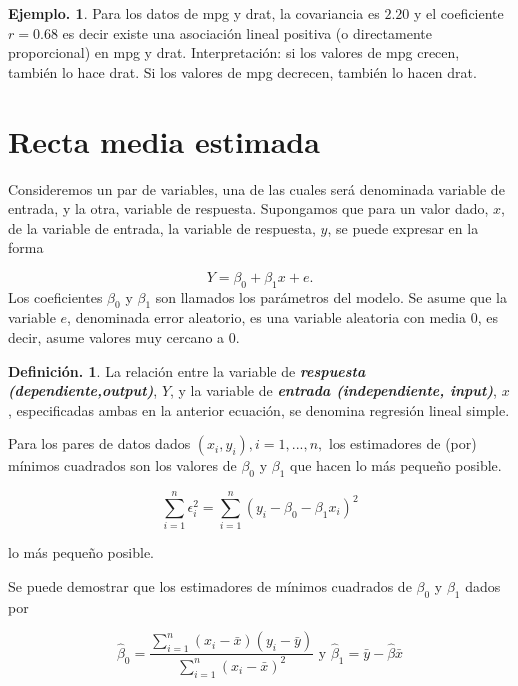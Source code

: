\documentclass[]{book}
\theoremstyle{definition}
\newtheorem{definition}{Definición.}[chapter]
\theoremstyle{definition}
\newtheorem{example}{Ejemplo.}[chapter]
\theoremstyle{definition}
\theoremstyle{remark}
\begin{document}
\begin{example}
\protect\hypertarget{exm:unnamed-chunk-78}{}{\label{exm:unnamed-chunk-78} }
Para los datos de mpg y drat, la covariancia es
\(2.20\) y el
coeficiente \(r=0.68\) es decir existe una
asociación lineal
positiva (o directamente proporcional) en mpg y
drat.
Interpretación: si los valores de mpg crecen,
también lo hace
drat. Si los valores de mpg decrecen, también lo
hacen drat.
\end{example}

\hypertarget{recta-media-estimada}{%
\section{Recta media estimada}\label{recta-media-estimada}}

Consideremos un par de variables, una de las
cuales será denominada variable de entrada, y la
otra, variable de respuesta.
Supongamos que para un valor dado, \(x\), de la
variable de
entrada, la variable de respuesta, \(y\), se puede
expresar en la forma

\[ Y = \beta_0 + \beta_1 x + e.\]
Los coeficientes \(\beta_0\) y \(\beta_1\) son
llamados los
parámetros del modelo. Se asume que la variable
\(e\), denominada
error aleatorio, es una variable aleatoria con
media \(0\), es
decir, asume valores muy cercano a \(0\).

\begin{definition}
\protect\hypertarget{def:unnamed-chunk-79}{}{\label{def:unnamed-chunk-79} }La relación entre la variable de \textbf{\emph{respuesta
(dependiente,output)}}, \(Y\), y la variable de
\textbf{\emph{entrada
(independiente, input)}}, \(x\), especificadas
ambas en la anterior
ecuación, se denomina regresión lineal simple.
\end{definition}

Para los pares de datos dados \((x_i, y_i), i = 1, . . . , n,\) los
estimadores de (por) mínimos cuadrados son los
valores de
\(\beta_0\) y \(\beta_1\) que hacen lo más pequeño
posible.

\[ \sum_{i=1}^{n}
\epsilon_{i}^{2}=\sum_{i=1}^{n}\left(y_{i}-
\beta_0-\beta_1
x_{i}\right)^{2} \]

lo más pequeño posible.

Se puede demostrar que los estimadores de mínimos
cuadrados de
\(\beta_0\) y \(\beta_1\) dados por

\[
\hat{\beta}_0=\frac{\sum_{i=1}^{n}\left(x_{i}-
\bar{x}\right)\left(y_
{i}-\bar{y}\right)}{\sum_{i=1}^{n}\left(x_{i}-
\bar{x}\right)^{2}}
\text{ y } 
\hat{\beta}_1=\bar{y}-\hat{\beta} \bar{x}
\]
\end{document}
